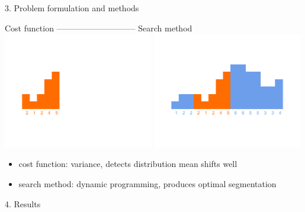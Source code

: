 \documentclass[first=orange,second=blue,logo=blueque]{aaltoslides}
\begin{document}
\begin{frame}{3. Problem formulation and methods}
    \begin{block}{ {\color{black}Cost function} {\color{white}-----------------------------} {\color{black}Search method}}
        \includegraphics[width=0.49\textwidth]{figures/costfunction.pdf}
        \includegraphics[width=0.49\textwidth]{figures/searchmethod.pdf}\\
        \vspace{-1cm} \hspace{0.5cm}
        \color{orange}{$\sigma^2=2.7$}
        \begin{itemize}
            \item \alert{cost function}: variance, detects distribution mean shifts well
            \item \alert{search method}: dynamic programming, produces optimal segmentation
        \end{itemize}
    \end{block}
\end{frame}


\begin{frame}{4. Results}
\end{frame}
\end{document}
